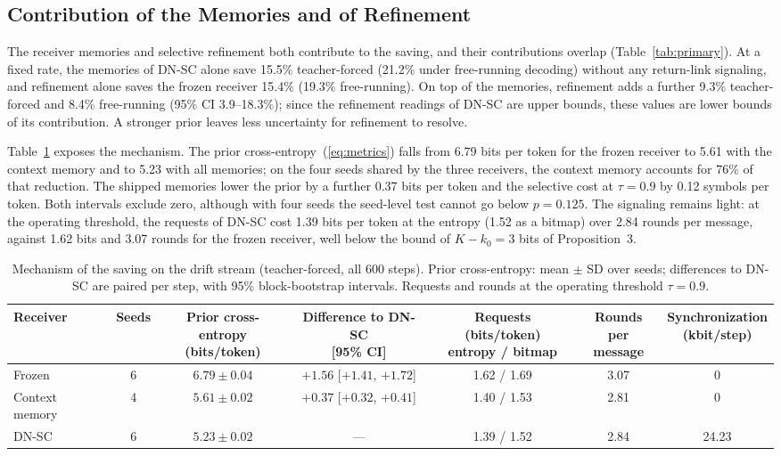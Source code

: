 \subsection{Contribution of the Memories and of Refinement}
\label{sec:results-memories}

The receiver memories and selective refinement both contribute to the saving, and their contributions overlap (Table~\ref{tab:primary}). At a fixed rate, the memories of DN-SC alone save 15.5\% teacher-forced (21.2\% under free-running decoding) without any return-link signaling, and refinement alone saves the frozen receiver 15.4\% (19.3\% free-running). On top of the memories, refinement adds a further 9.3\% teacher-forced and 8.4\% free-running (95\% CI 3.9--18.3\%); since the refinement readings of DN-SC are upper bounds, these values are lower bounds of its contribution. A stronger prior leaves less uncertainty for refinement to resolve.

Table~\ref{tab:decomposition} exposes the mechanism. The prior cross-entropy~(\ref{eq:metrics}) falls from 6.79 bits per token for the frozen receiver to 5.61 with the context memory and to 5.23 with all memories; on the four seeds shared by the three receivers, the context memory accounts for 76\% of that reduction. The shipped memories lower the prior by a further 0.37 bits per token and the selective cost at $\tau = 0.9$ by 0.12 symbols per token. Both intervals exclude zero, although with four seeds the seed-level test cannot go below $p = 0.125$. The signaling remains light: at the operating threshold, the requests of DN-SC cost 1.39 bits per token at the entropy (1.52 as a bitmap) over 2.84 rounds per message, against 1.62 bits and 3.07 rounds for the frozen receiver, well below the bound of $K-k_0 = 3$ bits of Proposition~3.

\begin{table}[!tbp]
\centering
\caption{Mechanism of the saving on the drift stream (teacher-forced, all 600 steps). Prior cross-entropy: mean $\pm$ SD over seeds; differences to DN-SC are paired per step, with 95\% block-bootstrap intervals. Requests and rounds at the operating threshold $\tau = 0.9$.}
\label{tab:decomposition}
\footnotesize\setlength{\tabcolsep}{3.6pt}
\begin{tabular}{@{}lcccccc@{}}
\toprule
Receiver & Seeds & \makecell{Prior cross-entropy\\(bits/token)} & \makecell{Difference to DN-SC\\{[95\% CI]}} & \makecell{Requests (bits/token)\\entropy / bitmap} & \makecell{Rounds per\\message} & \makecell{Synchronization\\(kbit/step)} \\
\midrule
Frozen & 6 & $6.79\pm0.04$ & $+1.56$ [$+1.41$, $+1.72$] & 1.62 / 1.69 & 3.07 & 0 \\
Context memory & 4 & $5.61\pm0.02$ & $+0.37$ [$+0.32$, $+0.41$] & 1.40 / 1.53 & 2.81 & 0 \\
DN-SC & 6 & $5.23\pm0.02$ & --- & 1.39 / 1.52 & 2.84 & 24.23 \\
\bottomrule
\end{tabular}
\end{table}

